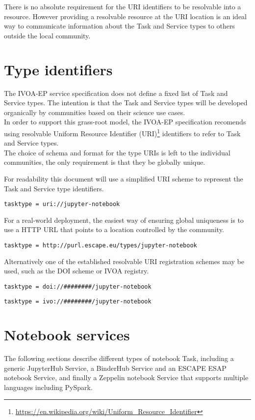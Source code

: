 \documentclass[11pt,a4paper]{ivoa}
\newcommand{\ivoep} {IVOA-EP\xspace}
\newcommand{\binderhub} {BinderHub\xspace}
\newcommand{\jupyterhub} {JupyterHub\xspace}
\newcommand{\esap} {ESAP\xspace}
\newcommand{\escape} {ESCAPE\xspace}
\newcommand{\pyspark} {PySpark\xspace}
\newcommand{\zeppelin} {Zeppelin\xspace}
\newcommand{\footurl}[1] {\footnote{\url{#1}}}
\begin{document}
There is no absolute requirement for the URI identifiers to be resolvable into a resource.
However providing a resolvable resource at the URI location is an ideal way to communicate information about the Task and Service types to others outside the local community. 

\section{Type identifiers}
\label{sec:type-identifiers}
The \ivoep service specification does not define a fixed list of Task and Service types. 
The intention is that the Task and Service types will be developed organically by communities based on their science use cases.
\\
In order to support this grass-root model, the \ivoep specification recomends using resolvable Uniform Resource Identifier (URI)\footurl{https://en.wikipedia.org/wiki/Uniform_Resource_Identifier} identifiers to refer to Task and Service types.
\\
The choice of schema and format for the type URIs is left to the individual communities, the only requirement is that they be globally unique.

For readability this document will use a simplified URI scheme to represent the Task and Service type identifiers.
\begin{lstlisting}[]
    tasktype = uri://jupyter-notebook
\end{lstlisting}

For a real-world deployment, the easiest way of ensuring global uniqueness is to use a HTTP URL that points to a location controlled by the community.
\begin{lstlisting}[]
    tasktype = http://purl.escape.eu/types/jupyter-notebook
\end{lstlisting}
Alternatively one of the established resolvable URI registration schemes may be used, such as the DOI scheme or IVOA registry.
\begin{lstlisting}[]
    tasktype = doi://########/jupyter-notebook
\end{lstlisting}
\begin{lstlisting}[]
    tasktype = ivo://########/jupyter-notebook
\end{lstlisting}


\section{Notebook services}
\label{sec:notebook-services}
The following sections describe different types of notebook Task, including a generic \jupyterhub Service, a \binderhub Service and an \escape \esap notebook Service, and finally a \zeppelin notebook Service that supports multiple languages including \pyspark. 
\end{document}
